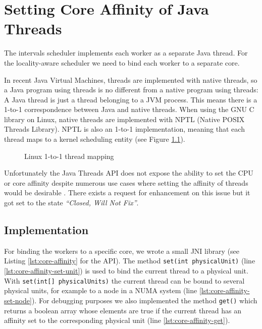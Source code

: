 
\chapter{Setting Core Affinity of Java Threads}
\label{chap:appendix-core-affinity}

The intervals scheduler implements each worker as a separate Java
thread. For the locality-aware scheduler we need to bind each worker
to a separate core.

In recent Java Virtual Machines, threads are implemented with native
threads, so a Java program using threads is no different from a native
program using threads: A Java thread is just a thread belonging to a
JVM process. This means there is a 1-to-1 correspondence between Java
and native threads. When using the GNU C library on Linux, native
threads are implemented with NPTL (Native POSIX Threads Library). NPTL
is also an 1-to-1 implementation, meaning that each thread maps to a
kernel scheduling entity (see Figure
\ref{fig:core-affinity-thread-mapping}).

\begin{figure}[htb]
  \centering
  \caption{Linux 1-to-1 thread mapping}
  \label{fig:core-affinity-thread-mapping}
\end{figure}

Unfortunately the Java Threads API does not expose the ability to set
the CPU or core affinity despite numerous use cases where setting the
affinity of threads would be desirable \cite{Love2003, Dow2005,
  Foong2008}.  There exists a request for enhancement
\cite{Oracle1999} on this issue but it got set to the state
\emph{``Closed, Will Not Fix''}.


\section{Implementation}
\label{sec:appendix-core-affinity-implementation}

For binding the workers to a specific core, we wrote a small JNI
library (see Listing \ref{lst:core-affinity} for the API). The method
\lstinline!set(int physicalUnit)!  (line
\ref{lst:core-affinity-set-unit}) is used to bind the current thread
to a physical unit. With \lstinline!set(int[] physicalUnits)! the
current thread can be bound to several physical units, for example to
a node in a NUMA system (line \ref{lst:core-affinity-set-node}). For
debugging purposes we also implemented the method \lstinline!get()!
which returns a boolean array whose elements are true if the current
thread has an affinity set to the corresponding physical unit (line
\ref{lst:core-affinity-get}).

